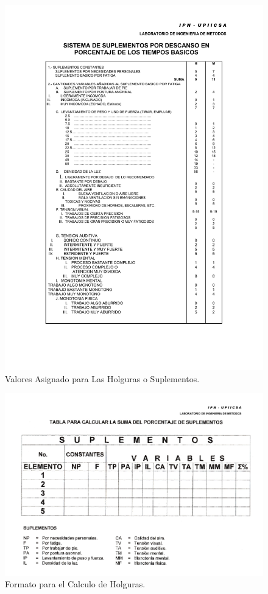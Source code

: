   \begin{figure}[H]
      \centering
      \includegraphics[scale=0.4]{15/img/tablaHolguras.pdf}
      \caption{Valores Asignado para Las Holguras o Suplementos.}
      \label{fig:holguras}
  \end{figure}
  
   \begin{figure}[H]
      \centering
      \includegraphics[scale=0.3]{15/img/tablaCalculoHolguras.pdf}
      \caption{Formato para el Calculo de Holguras.}
      \label{fig:tablaCalculoHolguras}
  \end{figure}
  
